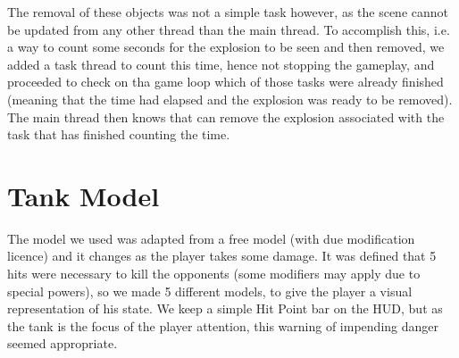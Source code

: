 \documentclass[11pt,a4paper]{report}
\begin{document}
The removal of these objects was not a simple task however, as the scene cannot be updated from any other thread than the main thread. To accomplish this, i.e. a way to count some seconds for the explosion to be seen and then removed, we added a task thread to count this time, hence not stopping the gameplay, and proceeded to check on tha game loop which of those tasks were already finished (meaning that the time had elapsed and the explosion was ready to be removed). \\

The main thread then knows that can remove the explosion associated with the task that has finished counting the time.


\chapter{Tank Model}

The model we used was adapted from a free model (with due modification licence) and it changes as the player takes some damage. It was defined that 5 hits were necessary to kill the opponents (some modifiers may apply due to special powers), so we made 5 different models, to give the player a visual representation of his state. We keep a simple Hit Point bar on the HUD, but as the tank is the focus of the player attention, this warning of impending danger seemed appropriate.
\end{document}
